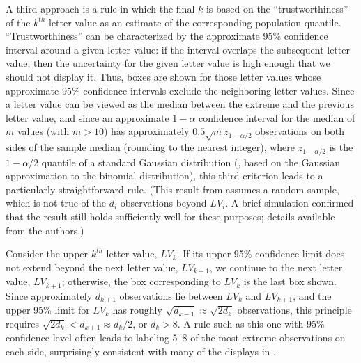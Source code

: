 \documentclass[12pt,oneside]{article}
\begin{document}
A third approach is a rule in which the final $k$ is based on the ``trustworthiness'' of the $k^{th}$ letter value as an estimate of the corresponding population quantile. ``Trustworthiness'' can be characterized by the approximate 95\% confidence interval around a given letter value: if the interval overlaps the subsequent letter value, then the uncertainty for the given letter value is high enough that we should not display it. Thus, boxes are shown for those letter values whose approximate 95\% confidence intervals exclude the neighboring letter values. Since a letter value can be viewed as the median between the extreme and the previous letter value, and since an approximate $1-\alpha$ confidence interval for the median of $m$ values (with $m > 10$) has approximately $0.5 \sqrt{m} z_{1-\alpha/2}$ observations on both sides of the sample median (rounding to the nearest integer), where $z_{1-\alpha/2}$ is the ${1-\alpha/2}$ quantile of a standard Gaussian distribution (\citet[161]{ha.order}, based on the Gaussian approximation to the binomial distribution), this third criterion leads to a particularly straightforward rule. (This result from \citet[161]{ha.order} assumes a random sample, which is not true of the $d_i$ observations beyond $LV_i$. A brief simulation confirmed that the result still holds sufficiently well for these purposes; details available from the authors.) 


Consider the upper $k^{th}$ letter value, $LV_k$. If its upper 95\% confidence limit does not extend beyond the next letter value, $LV_{k+1}$, we continue to the next letter value, $LV_{k+1}$; otherwise, the box corresponding to $LV_k$ is the last box shown. Since approximately $d_{k+1}$ observations lie between $LV_k$ and $LV_{k+1}$, and the upper 95\% limit for $LV_k$ has roughly $\sqrt{d_{k-1}} \approx \sqrt{2 d_k }$ observations, this principle requires $\sqrt{2 d_k} < d_{k+1} \approx d_k / 2$, or $d_k > 8$. A rule such as this one with 95\% confidence level often leads to labeling 5--8 of the most extreme observations on each side, surprisingly consistent with many of the displays in \citet{eda}.
\end{document}
